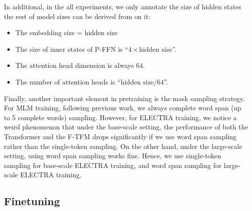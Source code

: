 \documentclass{article}
\theoremstyle{custom}
\begin{document}
In additional, in the all experiments, we only annotate the size of hidden states the rest of model sizes can be derived from on it:
\begin{itemize}
\item The embedding size = hidden size
\item The size of inner states of P-FFN is ``$4 \times \text{hidden size}$''.
\item The attention head dimension is always $64$.
\item The number of attention heads is ``$\text{hidden size} / 64$''.
\end{itemize}

Finally, another important element in pretraining is the mask sampling strategy.
For MLM training, following previous work, we always complete word span (up to 5 complete words) sampling.
However, for ELECTRA training, we notice a weird phenomenon that under the base-scale setting, the performance of both the Transformer and the F-TFM drops significantly if we use word span sampling rather than the single-token sampling.
On the other hand, under the large-scale setting, using word span sampling works fine.
Hence, we use single-token sampling for base-scale ELECTRA training, and word span sampling for large-scale ELECTRA training.

\subsection{Finetuning}
\end{document}

